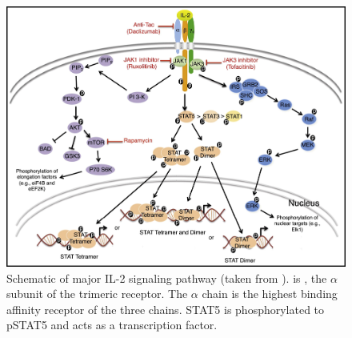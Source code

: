 \begin{figure}[h]
\centering
\includegraphics[scale=0.75]{IL2/figures/IL2-pathway.jpg}
{Schematic of major IL-2 signaling pathway (taken from \citet{Liao:2013jt}).}
{
 is , the $\alpha$ subunit of the trimeric  receptor.
The $\alpha$ chain is the highest binding affinity receptor of the three chains.
STAT5 is phosphorylated to pSTAT5 and acts as a transcription factor.
}
\end{figure}

